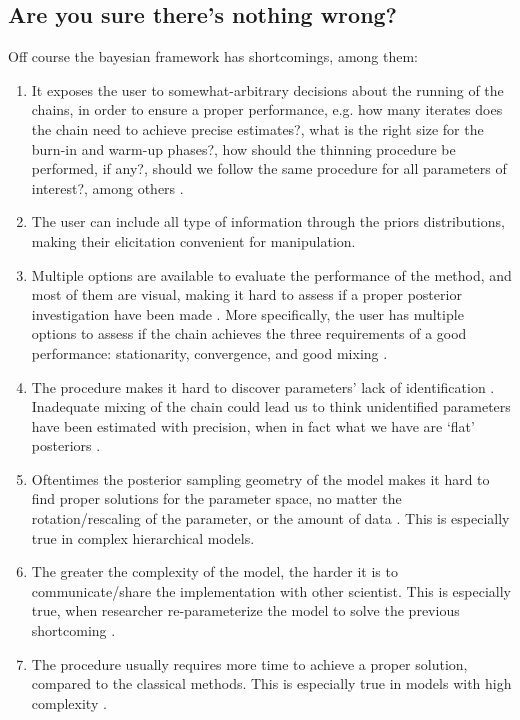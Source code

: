 
\subsection{Are you sure there's nothing wrong?} \label{sub_sect:bads}
Off course the bayesian framework has shortcomings, among them:

\begin{enumerate}	
	\item It exposes the user to somewhat-arbitrary decisions about the running of the chains, in order to ensure a proper performance, e.g. how many iterates does the chain need to achieve precise estimates?, what is the right size for the burn-in and warm-up phases?, how should the thinning procedure be performed, if any?, should we follow the same procedure for all parameters of interest?, among others \cite{Skrondal_et_al_2004a}. 
	
	\item The user can include all type of information through the priors distributions, making their elicitation convenient for manipulation.
	
	\item Multiple options are available to evaluate the performance of the method, and most of them are visual, making it hard to assess if a proper posterior investigation have been made \cite{Gelman_et_al_1996a}. More specifically, the user has multiple options to assess if the chain achieves the three requirements of a good performance: stationarity, convergence, and good mixing \cite{McElreath_2020}. 
	
	\item The procedure makes it hard to discover parameters' lack of identification \cite{Skrondal_et_al_2004a}. Inadequate mixing of the chain could lead us to think unidentified parameters have been estimated with precision, when in fact what we have are `flat' posteriors \cite{Keane_1992}.
	
	\item Oftentimes the posterior sampling geometry of the model makes it hard to find proper solutions for the parameter space, no matter the rotation/rescaling of the parameter, or the amount of data \cite{Betancourt_et_al_2013}. This is especially true in complex hierarchical models.
	
	\item The greater the complexity of the model, the harder it is to communicate/share the implementation with other scientist. This is especially true, when researcher re-parameterize the model to solve the previous shortcoming \cite{McElreath_2020}.
	
	\item The procedure usually requires more time to achieve a proper solution, compared to the classical methods. This is especially true in models with high complexity \cite{Tarazona_2013, Rivera_2019}.
\end{enumerate}

